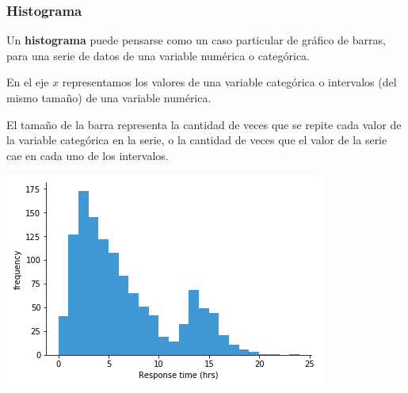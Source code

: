 \documentclass[aspectratio=169,12pt]{beamer}
\begin{document}
\begin{frame}
\frametitle{Histograma}

\begin{minipage}{.55\textwidth}
Un \textbf{histograma} puede pensarse como un caso particular de gráfico de barras, para una serie de datos de una variable numérica o categórica.

En el eje $x$ representamos los valores de una variable categórica o intervalos (del mismo tamaño) de una variable numérica.

El tamaño de la barra representa la cantidad de veces que se repite cada valor de la variable categórica en la serie, o la cantidad de veces que el valor de la serie cae en cada uno de los intervalos.
\end{minipage} \hspace{1cm} %
\begin{minipage}{.35\textwidth}
\begin{center}
\includegraphics[scale=1.5]{clase4-histogram-example-1.png}
\end{center}
\end{minipage}
\end{frame}


\end{document}
